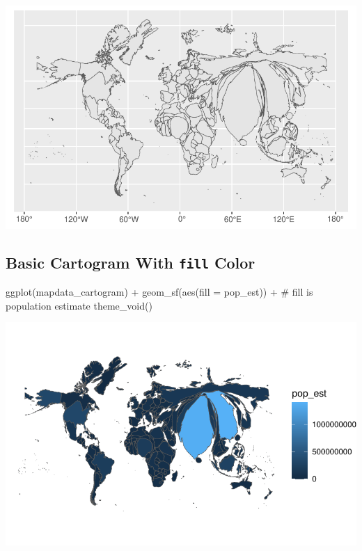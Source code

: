 \documentclass[
  letterpaper,
  DIV=11,
  numbers=noendperiod,
  oneside]{scrreprt}
\newenvironment{Shaded}{\begin{snugshade}}{\end{snugshade}}
\newcommand{\AttributeTok}[1]{\textcolor[rgb]{0.40,0.45,0.13}{#1}}
\newcommand{\CommentTok}[1]{\textcolor[rgb]{0.37,0.37,0.37}{#1}}
\newcommand{\FunctionTok}[1]{\textcolor[rgb]{0.28,0.35,0.67}{#1}}
\newcommand{\NormalTok}[1]{\textcolor[rgb]{0.00,0.23,0.31}{#1}}
\newcommand{\SpecialCharTok}[1]{\textcolor[rgb]{0.37,0.37,0.37}{#1}}
\begin{document}
\includegraphics{cartogram_files/figure-pdf/unnamed-chunk-9-1.pdf}

\subsection{\texorpdfstring{Basic Cartogram With \texttt{fill}
Color}{Basic Cartogram With fill Color}}\label{basic-cartogram-with-fill-color}

\begin{Shaded}
\begin{Highlighting}[]
\FunctionTok{ggplot}\NormalTok{(mapdata\_cartogram) }\SpecialCharTok{+} 
  \FunctionTok{geom\_sf}\NormalTok{(}\FunctionTok{aes}\NormalTok{(}\AttributeTok{fill =}\NormalTok{ pop\_est)) }\SpecialCharTok{+} \CommentTok{\# fill is population estimate}
  \FunctionTok{theme\_void}\NormalTok{()}
\end{Highlighting}
\end{Shaded}

\includegraphics{cartogram_files/figure-pdf/unnamed-chunk-10-1.pdf}
\end{document}
